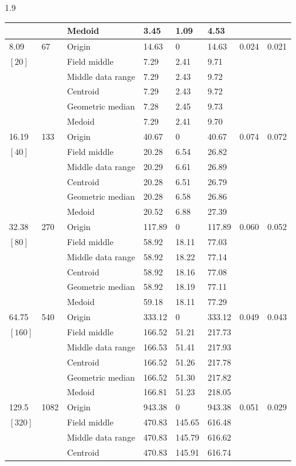\documentclass[phd]{ndsu-thesis-2022}
\newcommand\myspacing{1.9}      %
\begin{document}
\begin{spacing}{\myspacing}
{{\begin{ThreePartTable}
\begin{longtable}{lll lll ll}
 &  & Medoid  & 3.45 & 1.09 & 4.53 \\
\midrule
8.09 & 67 & Origin  & 14.63 & 0 & 14.63 & 0.024 & 0.021 \\
$[20]$ &  & Field middle  & 7.29 & 2.41 & 9.71 \\
 &  & Middle data range  & 7.29 & 2.43 & 9.72 \\
 &  & Centroid & 7.29 & 2.43 & 9.72 \\
 &  & Geometric median & 7.28 & 2.45 & 9.73 \\
 &  & Medoid  & 7.29 & 2.41 & 9.70 \\ 
\midrule
16.19 & 133 & Origin  & 40.67 & 0 & 40.67 & 0.074 & 0.072 \\
$[40]$ &  & Field middle  & 20.28 & 6.54 & 26.82 \\
 &  & Middle data range  & 20.29 & 6.61 & 26.89 \\
 &  & Centroid & 20.28 & 6.51 & 26.79 \\
 &  & Geometric median & 20.28 & 6.58 & 26.86 \\
 &  & Medoid  & 20.52 & 6.88 & 27.39 \\
\midrule
32.38 & 270 & Origin  & 117.89 & 0 & 117.89 & 0.060 & 0.052 \\
$[80]$ &  & Field middle  & 58.92 & 18.11 & 77.03 \\
 &  & Middle data range  & 58.92 & 18.22 & 77.14 \\
 &  & Centroid & 58.92 & 18.16 & 77.08 \\
 &  & Geometric median & 58.92 & 18.19 & 77.11 \\
 &  & Medoid  & 59.18 & 18.11 & 77.29 \\
\midrule
64.75 & 540 & Origin  & 333.12 & 0 & 333.12 & 0.049 & 0.043 \\
$[160]$ &  & Field middle  & 166.52 & 51.21 & 217.73 \\
 &  & Middle data range  & 166.53 & 51.41 & 217.93 \\
 &  & Centroid & 166.52 & 51.26 & 217.78 \\
 &  & Geometric median & 166.52 & 51.30 & 217.82 \\
 &  & Medoid  & 166.81 & 51.23 & 218.05 \\
\midrule
129.5 & 1082 & Origin  & 943.38 & 0 & 943.38 & 0.051 & 0.029 \\
$[320]$ &  & Field middle  & 470.83 & 145.65 & 616.48 \\
 &  & Middle data range  & 470.83 & 145.79 & 616.62 \\
 &  & Centroid & 470.83 & 145.91 & 616.74 \\

\end{longtable}
\end{ThreePartTable}}}
\end{spacing}
\end{document}
